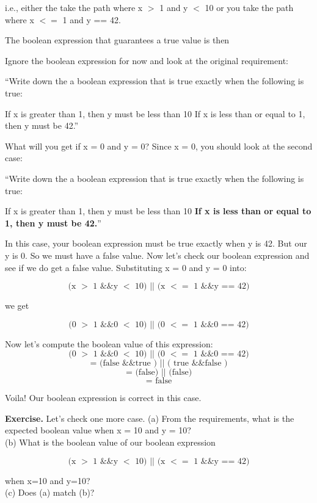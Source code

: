 {{{{{i.e., either the take the path where x $>$ 1 and y $<$ 10 or you take the path
where x $<=$ 1 and y == 42.

The boolean expression that guarantees a true value is then


Ignore the boolean expression for now and look at the original
requirement:

“Write down the a boolean expression that is true exactly when the
following is true:
\begin{tightlist}
\li If x is greater than 1, then y must be less than 10
\li If x is less than or equal to 1, then y must be 42.”
\end{tightlist}

What will you get if x = 0 and y = 0? Since x = 0, you should look at the
second case:

“Write down the a boolean expression that is true exactly when the
following is true:
\begin{tightlist}
\li If x is greater than 1, then y must be less than 10
\li \textbf{If x is less than or equal to 1, then y must be 42.}”
\end{tightlist}

In this case, your boolean expression must be true exactly when y is 42.
But our y is 0. So we must have a false value. Now let's check our
boolean expression and see if we do get a false value. Substituting x = 0
and y = 0 into:

\[\text{(x $>$ 1 \&\& y $<$ 10) $||$ (x $<=$ 1 \&\& y == 42)}\]

we get

\[\text{(0 $>$ 1 \&\& 0 $<$ 10) $||$ (0 $<=$ 1 \&\& 0 == 42)}\]

Now let's compute the boolean value of this expression:
\[\text{(0 $>$ 1 \&\& 0 $<$ 10) $||$ (0 $<=$ 1 \&\& 0 == 42)}\]
\[\text{= (false \&\& true ) $||$ ( true \&\& false )}\]
\[\text{= (false) $||$ (false)}\]
\[\text{= false}\]

Voila! Our boolean expression is correct in this case.

\textbf{Exercise.} Let's check one more case.
(a) From the requirements, what is the expected boolean value when x = 10 and y = 10?\\
(b) What is the boolean value of our boolean expression

\[\text{(x $>$ 1 \&\& y $<$ 10) || (x $<=$ 1 \&\& y == 42)}\]

when x=10 and y=10?\\
(c) Does (a) match (b)?

}}}}}
